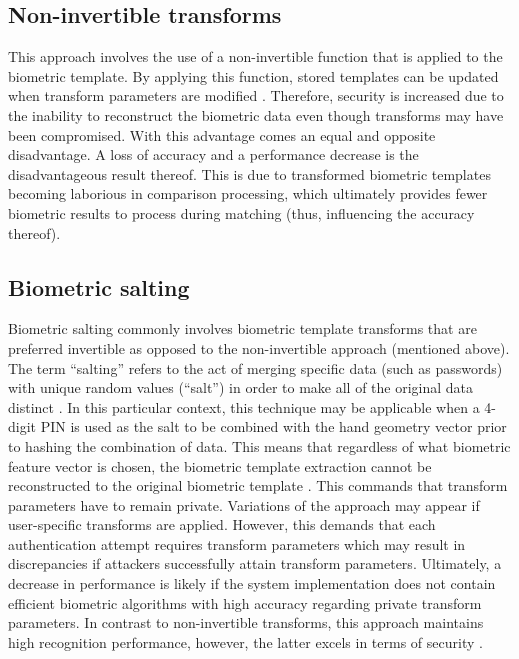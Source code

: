 	\subsection{Non-invertible transforms}
	This approach involves the use of a non-invertible function that is applied to the biometric template. By applying this function, stored templates can be updated when transform parameters are modified \cite{Piciucco2016,Rathgeb2011}. Therefore, security is increased due to the inability to reconstruct the biometric data even though transforms may have been compromised. With this advantage comes an equal and opposite disadvantage. A loss of accuracy and a performance decrease is the disadvantageous result thereof. This is due to transformed biometric templates becoming laborious in comparison processing, which ultimately provides fewer biometric results to process during matching (thus, influencing the accuracy thereof).
	
	\subsection{Biometric salting}
	Biometric salting commonly involves biometric template transforms that are preferred invertible as opposed to the non-invertible approach (mentioned above). The term “salting” refers to the act of merging specific data (such as passwords) with unique random values (“salt”) in order to make all of the original data distinct \cite{SyedAhmad2012}. In this particular context, this technique may be applicable when a 4-digit PIN is used as the salt to be combined with the hand geometry vector prior to hashing the combination of data. This means that regardless of what biometric feature vector is chosen, the biometric template extraction cannot be reconstructed to the original biometric template \cite{Paul2014,Rathgeb2011}. This commands that transform parameters have to remain private. Variations of the approach may appear if user-specific transforms are applied. However, this demands that each authentication attempt requires transform parameters which may result in discrepancies if attackers successfully attain transform parameters. Ultimately, a decrease in performance is likely if the system implementation does not contain efficient biometric algorithms with high accuracy regarding private transform parameters. In contrast to non-invertible transforms, this approach maintains high recognition performance, however, the latter excels in terms of security \cite{Radha2011, Rathgeb2011}.



